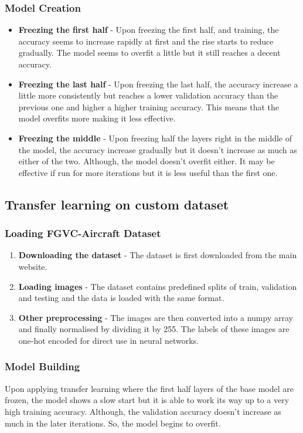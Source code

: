 \documentclass[conference,compsoc]{IEEEtran}
\begin{document}
\subsubsection{Model Creation}
\begin{itemize}
    \item \textbf{Freezing the first half} - Upon freezing the first half, and training, the accuracy seems to increase rapidly at first and the rise starts to reduce gradually. The model seems to overfit a little but it still reaches a decent accuracy.
    \item \textbf{Freezing the last half} - Upon freezing the last half, the accuracy increase a little more consistently but reaches a lower validation accuracy than the previous one and higher a higher training accuracy. This means that the model overfits more making it less effective.
    \item \textbf{Freezing the middle} - Upon freezing half the layers right in the middle of the model, the accuracy increase gradually but it doesn't increase as much as either of the two. Although, the model doesn't overfit either. It may be effective if run for more iterations but it is less useful than the first one. 
\end{itemize}

\subsection{Transfer learning on custom dataset}
\subsubsection{Loading FGVC-Aircraft Dataset}
\begin{enumerate}
    \item \textbf{Downloading the dataset} - The dataset is first downloaded from the main website.
    \item \textbf{Loading images} - The dataset contains predefined splits of train, validation and testing and the data is loaded with the same format.
    \item \textbf{Other preprocessing} - The images are then converted into a numpy array and finally normalised by dividing it by 255. The labels of these images are one-hot encoded for direct use in neural networks.
\end{enumerate}

\subsubsection{Model Building}
Upon applying transfer learning where the first half layers of the base model are frozen, the model shows a slow start but it is able to work its way up to a very high training accuracy. Although, the validation accuracy doesn't increase as much in the later iterations. So, the model begins to overfit.
\end{document}
